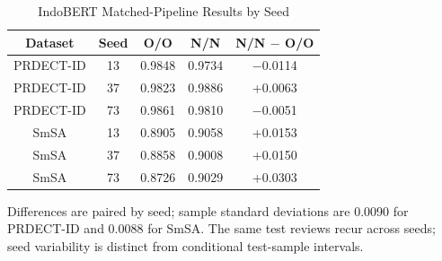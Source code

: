 \documentclass[conference]{IEEEtran}
\begin{document}
\begin{table}[!ht]
\caption{IndoBERT Matched-Pipeline Results by Seed}
\centering\small
\renewcommand{\arraystretch}{1.06}
\setlength{\tabcolsep}{2pt}
\begin{tabular}{|c|c|c|c|c|}
\hline
\textbf{Dataset} & \textbf{Seed} & \textbf{O/O} & \textbf{N/N} & \textbf{N/N $-$ O/O} \\
\hline
PRDECT-ID & 13 & 0.9848 & 0.9734 & $-$0.0114 \\
\hline
PRDECT-ID & 37 & 0.9823 & 0.9886 & +0.0063 \\
\hline
PRDECT-ID & 73 & 0.9861 & 0.9810 & $-$0.0051 \\
\hline
SmSA & 13 & 0.8905 & 0.9058 & +0.0153 \\
\hline
SmSA & 37 & 0.8858 & 0.9008 & +0.0150 \\
\hline
SmSA & 73 & 0.8726 & 0.9029 & +0.0303 \\
\hline
\end{tabular}
\par\vspace{3pt}\raggedright\small Differences are paired by seed; sample standard deviations are 0.0090 for PRDECT-ID and 0.0088 for SmSA. The same test reviews recur across seeds; seed variability is distinct from conditional test-sample intervals.
\end{table}
\end{document}
